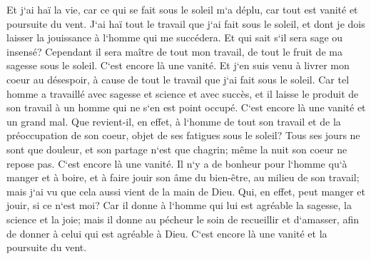 \verse Et j`ai haï la vie, car ce qui se fait sous le soleil m`a déplu, car tout est vanité et poursuite du vent. 
\verse J`ai haï tout le travail que j`ai fait sous le soleil, et dont je dois laisser la jouissance à l`homme qui me succédera. 
\verse Et qui sait s`il sera sage ou insensé? Cependant il sera maître de tout mon travail, de tout le fruit de ma sagesse sous le soleil. C`est encore là une vanité. 
\verse Et j`en suis venu à livrer mon coeur au désespoir, à cause de tout le travail que j`ai fait sous le soleil. 
\verse Car tel homme a travaillé avec sagesse et science et avec succès, et il laisse le produit de son travail à un homme qui ne s`en est point occupé. C`est encore là une vanité et un grand mal. 
\verse Que revient-il, en effet, à l`homme de tout son travail et de la préoccupation de son coeur, objet de ses fatigues sous le soleil? 
\verse Tous ses jours ne sont que douleur, et son partage n`est que chagrin; même la nuit son coeur ne repose pas. C`est encore là une vanité. 
\verse Il n`y a de bonheur pour l`homme qu`à manger et à boire, et à faire jouir son âme du bien-être, au milieu de son travail; mais j`ai vu que cela aussi vient de la main de Dieu. 
\verse Qui, en effet, peut manger et jouir, si ce n`est moi? 
\verse Car il donne à l`homme qui lui est agréable la sagesse, la science et la joie; mais il donne au pécheur le soin de recueillir et d`amasser, afin de donner à celui qui est agréable à Dieu. C`est encore là une vanité et la poursuite du vent. 

